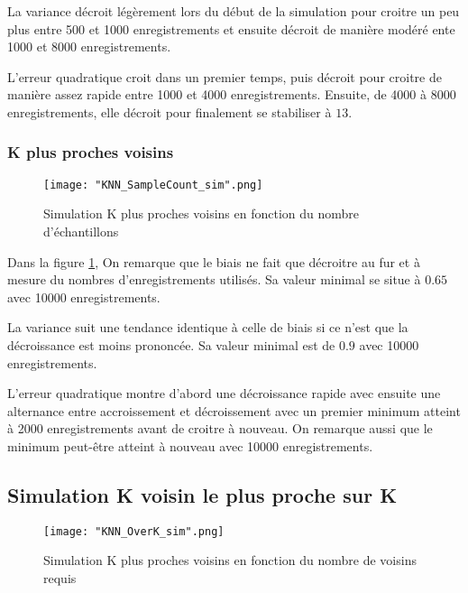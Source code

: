 \documentclass[a4paper]{article}
\begin{document}
La variance décroit légèrement lors du début de la simulation pour croitre un peu plus entre 500 et 1000 enregistrements et ensuite décroit de manière modéré ente 1000 et 8000 enregistrements. \newline

L'erreur quadratique croit dans un premier temps, puis décroit pour croitre de manière assez rapide entre 1000 et 4000 enregistrements. Ensuite, de 4000 à 8000 enregistrements, elle décroit pour finalement se stabiliser à $13$.

\newpage

\subsubsection{K plus proches voisins}

\begin{figure}[!h]
	\centering
	\texttt{[image: "KNN\_SampleCount\_sim".png]}
	\caption{Simulation K plus proches voisins en fonction du nombre d'échantillons}
	\label{KNN_SampleCount}
\end{figure}

Dans la figure \ref{KNN_SampleCount}, On remarque que le biais ne fait que décroitre au fur et à mesure du nombres d'enregistrements utilisés. Sa valeur minimal se situe à $0.65$ avec 10000 enregistrements. \newline

La variance suit une tendance identique à celle de biais si ce n'est que la décroissance est moins prononcée. Sa valeur minimal est de $0.9$ avec 10000 enregistrements. \newline 

L'erreur quadratique montre d'abord une décroissance rapide avec ensuite une alternance entre accroissement et décroissement avec un premier minimum atteint à 2000 enregistrements avant de croitre à nouveau. On remarque aussi que le minimum peut-être atteint à nouveau avec 10000 enregistrements.

\newpage

\subsection{Simulation K voisin le plus proche sur K}

\begin{figure}[!h]
	\centering
	\texttt{[image: "KNN\_OverK\_sim".png]}
	\caption{Simulation K plus proches voisins en fonction du nombre de voisins requis}
	\label{KNN_Over_K}
\end{figure}
\end{document}

